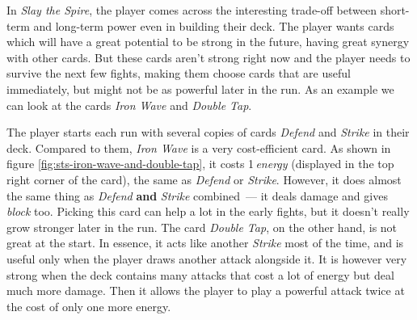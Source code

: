 In \emph{Slay the Spire}, the player comes across the interesting trade-off between short-term and long-term power even in building their deck.
The player wants cards which will have a great potential to be strong in the future, having great synergy with other cards.
But these cards aren't strong right now and the player needs to survive the next few fights, making them choose cards that are useful immediately, but might not be as powerful later in the run.
As an example we can look at the cards \emph{Iron Wave} and \emph{Double Tap}.

The player starts each run with several copies of cards \emph{Defend} and \emph{Strike} in their deck.
Compared to them, \emph{Iron Wave} is a very cost-efficient card.
As shown in figure \ref{fig:sts-iron-wave-and-double-tap}, it costs 1\,\emph{energy} (displayed in the top right corner of the card), the same as \emph{Defend} or \emph{Strike}.
However, it does almost the same thing as \emph{Defend} \textbf{and} \emph{Strike} combined~--- it deals damage and gives \emph{block} too.
Picking this card can help a lot in the early fights, but it doesn't really grow stronger later in the run.
The card \emph{Double Tap}, on the other hand, is not great at the start.
In essence, it acts like another \emph{Strike} most of the time, and is useful only when the player draws another attack alongside it.
It is however very strong when the deck contains many attacks that cost a lot of energy but deal much more damage.
Then it allows the player to play a powerful attack twice at the cost of only one more energy.

